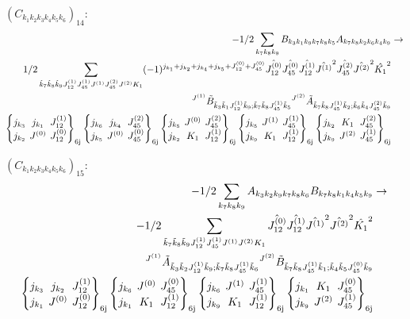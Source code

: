 \documentclass[11pt]{article}
\newcommand{\sixj}[6]{\begingroup\setlength{\arraycolsep}{0.2em}\begin{Bmatrix} #1 & #2 & #3 \\ #4 & #5 & #6 \end{Bmatrix}_{\text{6j}}\endgroup}
\begin{document}
$\left({C}_{{k}_{1}{k}_{2}{k}_{3}{k}_{4}{k}_{5}{k}_{6}}\right)_{14}$:
\begin{align}
-1/2\sum_{{k}_{7}{k}_{8}{k}_{9}}{B}_{{k}_{3}{k}_{1}{k}_{9}{k}_{7}{k}_{8}{k}_{5}}{A}_{{k}_{7}{k}_{8}{k}_{2}{k}_{6}{k}_{4}{k}_{9}}&\rightarrow \notag \\1/2\sum_{\tilde{k}_{7}\tilde{k}_{8}\tilde{k}_{9}J^{(1)}_{12}J^{(1)}_{45}J^{(1)}J^{(2)}_{45}J^{(2)}K_{1}}(-1)^{j_{{k}_{1}} +j_{{k}_{2}} +j_{{k}_{4}} +j_{{k}_{5}} +J^{(0)}_{12} +J^{(0)}_{45} }\hat{J^{(0)}_{12}}\hat{J^{(0)}_{45}}\hat{J^{(1)}_{12}}\hat{J^{(1)}}^{2}\hat{J^{(2)}_{45}}\hat{J^{(2)}}^{2}\hat{K_{1}}^{2}& \notag \\{}^{J^{(1)}}\tilde{B}_{\tilde{k}_{3}\tilde{k}_{1}J^{(1)}_{12}\tilde{k}_{9};\tilde{k}_{7}\tilde{k}_{8}J^{(1)}_{45}\tilde{k}_{5}}{}^{J^{(2)}}\tilde{A}_{\tilde{k}_{7}\tilde{k}_{8}J^{(1)}_{45}\tilde{k}_{2};\tilde{k}_{6}\tilde{k}_{4}J^{(2)}_{45}\tilde{k}_{9}}& \notag \\\sixj{j_{{k}_{3}}}{j_{{k}_{1}}}{J^{(1)}_{12}}{j_{{k}_{2}}}{J^{(0)}}{J^{(0)}_{12}}\sixj{j_{{k}_{6}}}{j_{{k}_{4}}}{J^{(2)}_{45}}{j_{{k}_{5}}}{J^{(0)}}{J^{(0)}_{45}}\sixj{j_{{k}_{5}}}{J^{(0)}}{J^{(2)}_{45}}{j_{{k}_{2}}}{K_{1}}{J^{(1)}_{12}}\sixj{j_{{k}_{5}}}{J^{(1)}}{J^{(1)}_{45}}{j_{{k}_{9}}}{K_{1}}{J^{(1)}_{12}}\sixj{j_{{k}_{2}}}{K_{1}}{J^{(2)}_{45}}{j_{{k}_{9}}}{J^{(2)}}{J^{(1)}_{45}}
\end{align}

$\left({C}_{{k}_{1}{k}_{2}{k}_{3}{k}_{4}{k}_{5}{k}_{6}}\right)_{15}$:
\begin{align}
-1/2\sum_{{k}_{7}{k}_{8}{k}_{9}}{A}_{{k}_{3}{k}_{2}{k}_{9}{k}_{7}{k}_{8}{k}_{6}}{B}_{{k}_{7}{k}_{8}{k}_{1}{k}_{4}{k}_{5}{k}_{9}}&\rightarrow \notag \\-1/2\sum_{\tilde{k}_{7}\tilde{k}_{8}\tilde{k}_{9}J^{(1)}_{12}J^{(1)}_{45}J^{(1)}J^{(2)}K_{1}}\hat{J^{(0)}_{12}}\hat{J^{(1)}_{12}}\hat{J^{(1)}}^{2}\hat{J^{(2)}}^{2}\hat{K_{1}}^{2}& \notag \\{}^{J^{(1)}}\tilde{A}_{\tilde{k}_{3}\tilde{k}_{2}J^{(1)}_{12}\tilde{k}_{9};\tilde{k}_{7}\tilde{k}_{8}J^{(1)}_{45}\tilde{k}_{6}}{}^{J^{(2)}}\tilde{B}_{\tilde{k}_{7}\tilde{k}_{8}J^{(1)}_{45}\tilde{k}_{1};\tilde{k}_{4}\tilde{k}_{5}J^{(0)}_{45}\tilde{k}_{9}}& \notag \\\sixj{j_{{k}_{3}}}{j_{{k}_{2}}}{J^{(1)}_{12}}{j_{{k}_{1}}}{J^{(0)}}{J^{(0)}_{12}}\sixj{j_{{k}_{6}}}{J^{(0)}}{J^{(0)}_{45}}{j_{{k}_{1}}}{K_{1}}{J^{(1)}_{12}}\sixj{j_{{k}_{6}}}{J^{(1)}}{J^{(1)}_{45}}{j_{{k}_{9}}}{K_{1}}{J^{(1)}_{12}}\sixj{j_{{k}_{1}}}{K_{1}}{J^{(0)}_{45}}{j_{{k}_{9}}}{J^{(2)}}{J^{(1)}_{45}}
\end{align}
\end{document}

